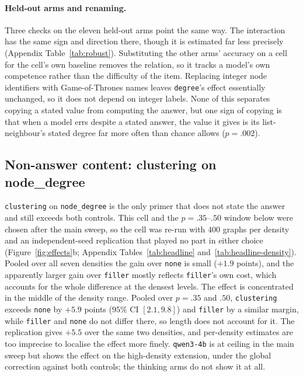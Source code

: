 \documentclass[11pt]{article}
\begin{document}
\paragraph{Held-out arms and renaming.}
\label{sec:results-heldout}
Three checks on the eleven held-out arms point the same way. The
interaction has the same sign and direction there, though it is estimated
far less precisely (Appendix Table~\ref{tab:robust}). Substituting the
other arms' accuracy on a cell for the cell's own baseline removes the
relation, so it tracks a model's own competence rather than the difficulty
of the item. Replacing integer node identifiers with Game-of-Thrones names
leaves \texttt{degree}'s effect essentially unchanged, so it does not
depend on integer labels. None of this separates copying a stated value
from computing the answer, but one sign of copying is that when a model
errs despite a stated answer, the value it gives is its list-neighbour's
stated degree far more often than chance allows ($p{=}.002$).

\subsection{Non-answer content: clustering on node\_degree}
\label{sec:results-clustering}

\texttt{clustering} on \texttt{node\_degree} is the only primer that does
not state the answer and still exceeds both controls. This cell and the
$p{=}.35$--$.50$ window below were chosen after the main sweep, so the cell
was re-run with $400$ graphs per density and an independent-seed
replication that played no part in either choice
(Figure~\ref{fig:effects}b; Appendix
Tables~\ref{tab:headline} and~\ref{tab:headline-density}). Pooled over all
seven densities the gain over \texttt{none} is small ($+1.9$ points), and
the apparently larger gain over \texttt{filler} mostly reflects
\texttt{filler}'s own cost, which accounts for the whole difference at the
densest levels. The effect is concentrated in the middle of the density
range. Pooled over $p{=}.35$ and $.50$, \texttt{clustering} exceeds
\texttt{none} by $+5.9$ points ($95\%$ CI $[2.1, 9.8]$) and \texttt{filler}
by a similar margin, while \texttt{filler} and \texttt{none} do not differ
there, so length does not account for it. The replication gives $+5.5$ over
the same two densities, and per-density estimates are too imprecise to
localise the effect more finely. \texttt{qwen3-4b} is at ceiling in the
main sweep but shows the effect on the high-density extension, under the
global correction against both controls; the thinking arms do not show it
at all.
\end{document}
